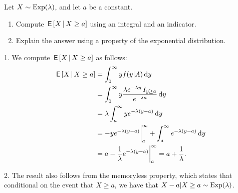 \documentclass[assignments]{subfiles}
\begin{document}
\begin{exercise}
Let $X \sim \mathrm{Exp}(\lambda)$, and let $a$ be a constant.
\begin{enumerate}
\item Compute $\,\mathsf{E}\left[X \,\middle|\, X \geq a\right]$ using an integral and an indicator.
\item Explain the answer using a property of the exponential distribution.
\end{enumerate}
\begin{solution}
1. We compute $\,\mathsf{E}\left[X \,\middle|\, X \geq a\right]$ as follows:
\begin{align*} \,\mathsf{E}\left[X \,\middle|\, X \geq a\right] &= \int_0^\infty y f(y|A) \,\textrm{d}y
\\ &= \int_0^\infty y \frac{\lambda e^{-\lambda y} \,I_{y \geq a}}{e^{-\lambda a}} \,\textrm{d}y
\\ &= \lambda \int_a^\infty y e^{-\lambda (y-a)} \,\textrm{d}y
\\ &= -y e^{-\lambda (y-a)}\biggr|_a^\infty +  \int_a^\infty e^{-\lambda (y-a)} \,\textrm{d}y
\\ &= a   - \frac1{\lambda} e^{-\lambda (y-a)}\biggr|_a^\infty   = a+\frac1\lambda.    \end{align*}

2.
The result also follows from the memoryless property, which states that conditional on the event that $X \geq a$, we have that $X-a | X \geq a \sim\mathrm{Exp}(\lambda)$.
\end{solution}
\end{exercise}
\end{document}
